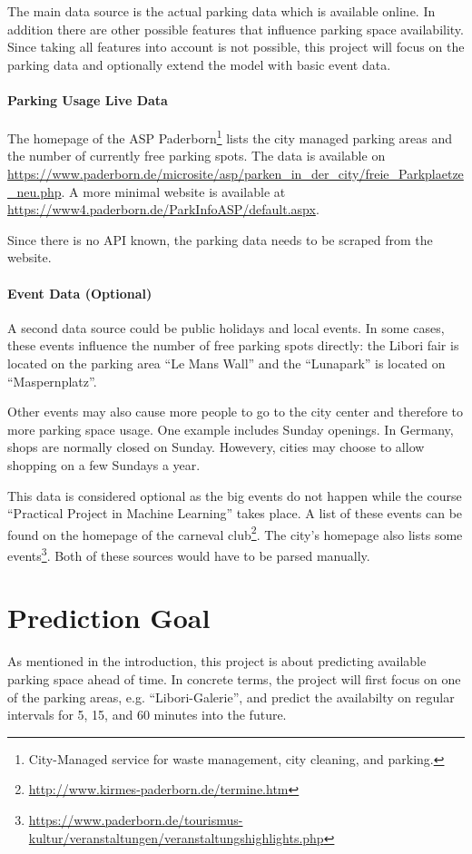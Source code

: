 The main data source is the actual parking data which is available online. In addition there are other possible features that influence parking space availability. Since taking all features into account is not possible, this project will focus on the parking data and optionally extend the model with basic event data.

\paragraph{Parking Usage Live Data}
The homepage of the ASP Paderborn\footnote{City-Managed service for waste management, city cleaning, and parking.} lists the city managed parking areas and the number of currently free parking spots. 
The data is available on \url{https://www.paderborn.de/microsite/asp/parken_in_der_city/freie_Parkplaetze_neu.php}. A more minimal website is available at \url{https://www4.paderborn.de/ParkInfoASP/default.aspx}. 

Since there is no API known, the parking data needs to be scraped from the website.  
\paragraph{Event Data (Optional)}
A second data source could be public holidays and local events. In some cases, these events influence the number of free parking spots directly: the Libori fair is located on the parking area ``Le Mans Wall'' and the ``Lunapark'' is located on ``Maspernplatz''. 

Other events may also cause more people to go to the city center and therefore to more parking space usage. One example includes Sunday openings. In Germany, shops are normally closed on Sunday. Howevery, cities may choose to allow shopping on a few Sundays a year. 

This data is considered optional as the big events do not happen while the course ``Practical Project in Machine Learning'' takes place. A list of these events can be found on the homepage of the carneval club\footnote{\url{http://www.kirmes-paderborn.de/termine.htm}}. The city's homepage also lists some events\footnote{\url{https://www.paderborn.de/tourismus-kultur/veranstaltungen/veranstaltungshighlights.php}}. Both of these sources would have to be parsed manually.


\section{Prediction Goal}
As mentioned in the introduction, this project is about predicting available parking space ahead of time. In concrete terms, the project will first focus on one of the parking areas, e.g. ``Libori-Galerie'', and predict the availabilty on regular intervals for 5, 15, and 60 minutes into the future.
